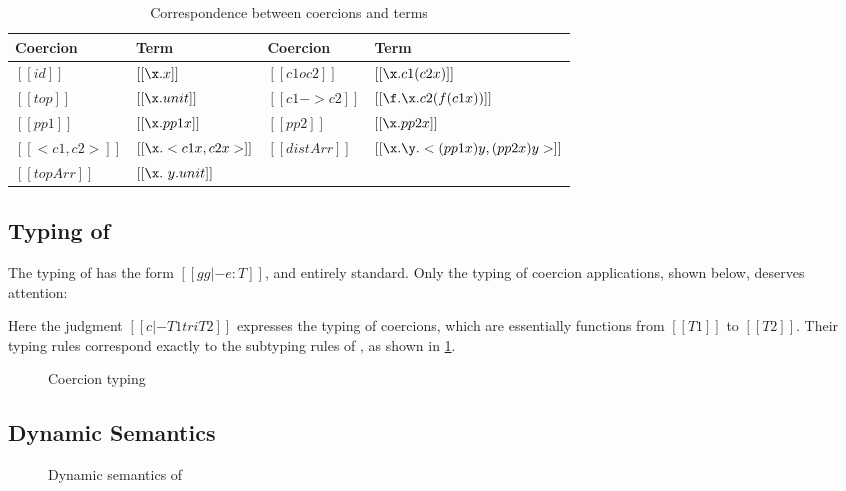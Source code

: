 \begin{table}[t]
  \centering
\begin{tabular}{|l|l||l|l|}
\hline
\textbf{Coercion} & \textbf{Term} & \textbf{Coercion} & \textbf{Term} \\ \hline
$[[id]]$         & $[[ \x . x]]$  & $[[ c1 o c2  ]]$    &  $[[  \x . c1 (c2 x) ]]$     \\ \hline
$[[top]]$         & $[[ \x . unit ]]$  & $[[ c1 -> c2  ]]$    &  $[[  \f . \x . c2 (f (c1 x))  ]]$     \\ \hline
$[[  pp1   ]]$         & $[[ \x . pp1 x    ]]$  & $[[ pp2  ]]$    &  $[[  \x . pp2 x  ]]$     \\ \hline
$[[  < c1 , c2 >   ]]$         & $[[ \x . < c1 x, c2 x >    ]]$  & $[[ distArr  ]]$    &  $[[  \x . \y . < (pp1 x) y , (pp2 x) y > ]]$     \\ \hline
$[[  topArr   ]]$         & $[[ \x . \ y . unit    ]]$  &  & \\ \hline
\end{tabular}
  \caption{Correspondence between coercions and terms}
  \label{tab:coercion}
\end{table}

\subsection{Typing of \tname}

The typing of \tname has the form $[[gg |- e : T]]$, and entirely standard. Only the typing of coercion
applications, shown below, deserves attention:
\begin{mathpar}
\end{mathpar}
Here the judgment $[[c |- T1 tri T2]]$ expresses the typing of coercions, which
are essentially functions from $[[T1]]$ to $[[T2]]$. Their typing
rules correspond exactly to the subtyping rules of \namee, as
shown in \cref{fig:co}.

\begin{figure}[t]
  \centering
  \caption{Coercion typing}
  \label{fig:co}
\end{figure}


\subsection{Dynamic Semantics}

\begin{figure}[t]
  \centering
{}
  \caption{Dynamic semantics of \tname}
  \label{fig:coercion_red}
\end{figure}

